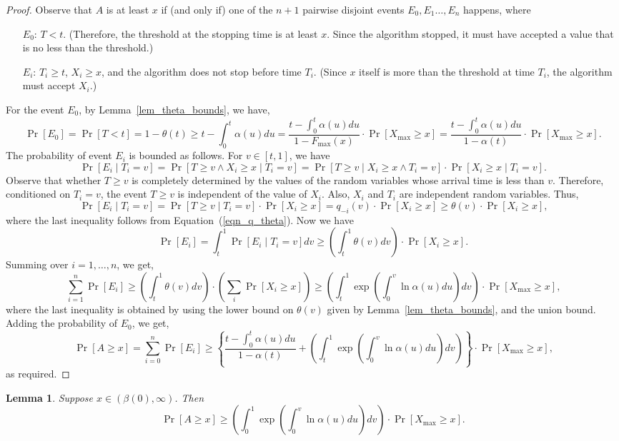 \documentclass[10pt, letterpaper, twoside]{article}
\newtheorem{lemma}{Lemma}
\begin{document}
\begin{proof}
Observe that $A$ is at least $x$ if (and only if) one of the $n+1$ pairwise disjoint events $E_0,E_1\ldots,E_n$ happens, where
\begin{enumerate}
\item[$E_0$:] $T<t$. (Therefore, the threshold at the stopping time is at least $x$. Since the algorithm stopped, it must have accepted a value that is no less than the threshold.)
\item[$E_i$:] $T_i\geq t$, $X_i\geq x$, and the algorithm does not stop before time $T_i$. (Since $x$ itself is more than the threshold at time $T_i$, the algorithm must accept $X_i$.)
\end{enumerate}
For the event $E_0$, by Lemma~\ref{lem_theta_bounds}, we have,
\[\Pr[E_0]=\Pr[T<t]=1-\theta(t)\geq t-\int_0^t\alpha(u)du=\frac{t-\int_0^t\alpha(u)du}{1-F_{\max}(x)}\cdot\Pr[X_{\max}\geq x]=\frac{t-\int_0^t\alpha(u)du}{1-\alpha(t)}\cdot\Pr[X_{\max}\geq x]\text{.}\]
The probability of event $E_i$ is bounded as follows. For $v\in[t,1]$, we have
\[\Pr[E_i\mid T_i=v]=\Pr[T\geq v\wedge X_i\geq x\mid T_i=v]=\Pr[T\geq v\mid X_i\geq x\wedge T_i=v]\cdot\Pr[X_i\geq x\mid T_i=v]\text{.}\]
Observe that whether $T\geq v$ is completely determined by the values of the random variables whose arrival time is less than $v$. Therefore, conditioned on $T_i=v$, the event $T\geq v$ is independent of the value of $X_i$. Also, $X_i$ and $T_i$ are independent random variables. Thus,
\[\Pr[E_i\mid T_i=v]=\Pr[T\geq v\mid T_i=v]\cdot\Pr[X_i\geq x]=q_{-i}(v)\cdot\Pr[X_i\geq x]\geq\theta(v)\cdot\Pr[X_i\geq x]\text{,}\]
where the last inequality follows from Equation~(\ref{eqn_q_theta}). Now we have
\[\Pr[E_i]=\int_t^1\Pr[E_i\mid T_i=v]dv\geq\left(\int_t^1\theta(v)dv\right)\cdot\Pr[X_i\geq x]\text{.}\]
Summing over $i=1,\ldots,n$, we get,
\[\sum_{i=1}^n\Pr[E_i]\geq\left(\int_t^1\theta(v)dv\right)\cdot\left(\sum_i\Pr[X_i\geq x]\right)\geq\left(\int_t^1\exp\left(\int_0^v\ln\alpha(u)du\right)dv\right)\cdot\Pr[X_{\max}\geq x]\text{,}\]
where the last inequality is obtained by using the lower bound on $\theta(v)$ given by Lemma~\ref{lem_theta_bounds}, and the union bound. Adding the probability of $E_0$, we get,
\[\Pr[A\geq x]=\sum_{i=0}^n\Pr[E_i]\geq\left\{\frac{t-\int_0^t\alpha(u)du}{1-\alpha(t)}+\left(\int_t^1\exp\left(\int_0^v\ln\alpha(u)du\right)dv\right)\right\}\cdot\Pr[X_{\max}\geq x]\text{,}\]
as required.
\end{proof}

\begin{lemma}\label{lem_large}
Suppose $x\in(\beta(0),\infty)$. Then
\[\Pr[A\geq x]\geq\left(\int_0^1\exp\left(\int_0^v\ln\alpha(u)du\right)dv\right)\cdot\Pr[X_{\max}\geq x]\text{.}\]
\end{lemma}
\end{document}
